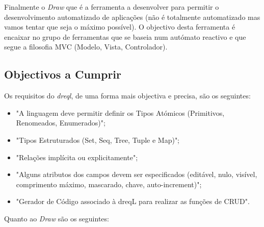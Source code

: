 \documentclass[a4paper]{article}
\begin{document}
\hspace{1cm}Finalmente o {\em Draw} que é a ferramenta a desenvolver para permitir o desenvolvimento automatizado de aplicações (não é totalmente automatizado mas vamos tentar que seja o máximo possível). O objectivo desta ferramenta é encaixar no grupo de ferramentas que se baseia num autómato reactivo e que segue a filosofia MVC (Modelo, Vista, Controlador).\\

\subsection{Objectivos a Cumprir}

Os requisitos do {\em dreql}, de uma forma mais objectiva e precisa, são os seguintes:

\begin{itemize}
\item "A linguagem deve permitir definir os Tipos Atómicos (Primitivos, Renomeados, Enumerados)";
\item "Tipos Estruturados (Set, Seq, Tree, Tuple e Map)";
\item "Relações implícita ou explicitamente";
\item "Alguns atributos dos campos devem ser especificados (editável, nulo, visível, comprimento máximo, mascarado, chave, auto-increment)";
\item "Gerador de Código associado à dreqL para realizar as funções de CRUD".
\end{itemize}

Quanto ao {\em Draw} são os seguintes:
\end{document}
